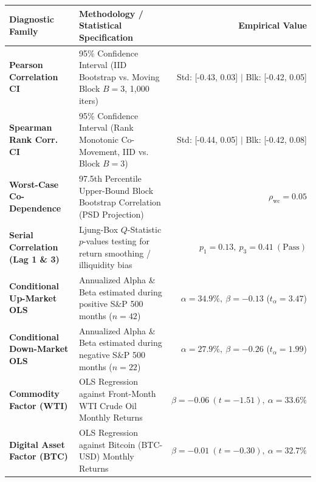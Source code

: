 \documentclass[10pt,a4paper]{article}
\begin{document}
\vspace{0.45em}

\begin{tcolorbox}[colback=white, colframe=primary, title=\textbf{\small\strut Appendix A: Extended Statistical, Bootstrap \& Factor Diagnostics}, fonttitle=\sffamily\bfseries\small, arc=5pt, boxrule=0.8pt, toptitle=4pt, bottomtitle=4pt, left=6pt, right=6pt, top=3.5pt, bottom=3.5pt, colbacktitle=primary]
\renewcommand{\arraystretch}{1.22}
\scriptsize
\begin{tabularx}{\textwidth}{l X r}
\toprule
\textbf{\textcolor{primary}{Diagnostic Family}} & \textbf{\textcolor{primary}{Methodology / Statistical Specification}} & \textbf{\textcolor{primary}{Empirical Value}} \\
\midrule
\textbf{Pearson Correlation CI} & 95\% Confidence Interval (IID Bootstrap vs. Moving Block $B=3$, 1,000 iters) & Std: [-0.43, 0.03] $\vert$ Blk: [-0.42, 0.05] \\
\rowcolor{cardbg} \textbf{Spearman Rank Corr. CI} & 95\% Confidence Interval (Rank Monotonic Co-Movement, IID vs. Block $B=3$) & Std: [-0.44, 0.05] $\vert$ Blk: [-0.42, 0.08] \\
\textbf{Worst-Case Co-Dependence} & 97.5th Percentile Upper-Bound Block Bootstrap Correlation (PSD Projection) & $\rho_{\text{wc}} = 0.05$ \\
\rowcolor{cardbg} \textbf{Serial Correlation (Lag 1 \& 3)} & Ljung-Box $Q$-Statistic $p$-values testing for return smoothing / illiquidity bias & $p_1=0.13,\ p_3=0.41\ (\text{Pass})$ \\
\textbf{Conditional Up-Market OLS} & Annualized Alpha \& Beta estimated during positive S\&P 500 months ($n=42$) & $\alpha=34.9\%,\ \beta=-0.13$ ($t_\alpha=3.47$) \\
\rowcolor{cardbg} \textbf{Conditional Down-Market OLS} & Annualized Alpha \& Beta estimated during negative S\&P 500 months ($n=22$) & $\alpha=27.9\%,\ \beta=-0.26$ ($t_\alpha=1.99$) \\
\textbf{Commodity Factor (WTI)} & OLS Regression against Front-Month WTI Crude Oil Monthly Returns & $\beta=-0.06\ (t=-1.51),\ \alpha=33.6\%$ \\
\rowcolor{cardbg} \textbf{Digital Asset Factor (BTC)} & OLS Regression against Bitcoin (BTC-USD) Monthly Returns & $\beta=-0.01\ (t=-0.30),\ \alpha=32.7\%$ \\
\bottomrule
\end{tabularx}
\end{tcolorbox}
\end{document}
